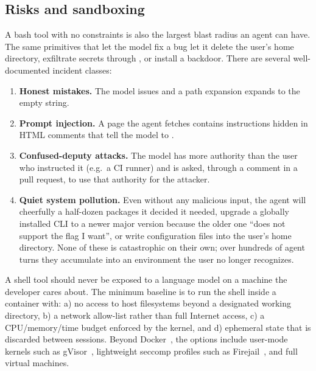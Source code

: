 \subsection{Risks and sandboxing}
\label{sec:sandbox}

A bash tool with no constraints is also the largest blast radius an
agent can have. The same primitives that let the model fix a bug let
it delete the user's home directory, exfiltrate secrets through
, or install a backdoor. There are several well-documented
incident classes:

\begin{enumerate}[label=(\arabic*)]
\item \textbf{Honest mistakes.} The model issues
   and a path expansion expands  to
  the empty string.
\item \textbf{Prompt injection.} A page the agent fetches contains
  instructions hidden in HTML comments that tell the model to
  .
\item \textbf{Confused-deputy attacks.} The model has more authority
  than the user who instructed it (e.g.\ a CI runner) and is asked,
  through a comment in a pull request, to use that authority for
  the attacker.
\item \textbf{Quiet system pollution.} Even without any malicious
  input, the agent will cheerfully  a half-dozen
  packages it decided it needed, upgrade a globally installed CLI to
  a newer major version because the older one ``does not support
  the flag I want'', or write configuration files into the user's
  home directory. None of these is catastrophic on their own; over
  hundreds of agent turns they accumulate into an environment the
  user no longer recognizes.
\end{enumerate}

\begin{warningbox}
\small
A shell tool should never be exposed to a language model on a
machine the developer cares about. The minimum baseline is to run
the shell inside a container with: a) no access to host
filesystems beyond a designated working directory, b) a network
allow-list rather than full Internet access, c) a CPU/memory/time
budget enforced by the kernel, and d) ephemeral state that is
discarded between sessions. Beyond Docker~\citep{docker2013}, the
options include user-mode kernels such as
gVisor~\citep{gvisor2018}, lightweight seccomp profiles such as
Firejail~\citep{firejail}, and full virtual machines.
\end{warningbox}

